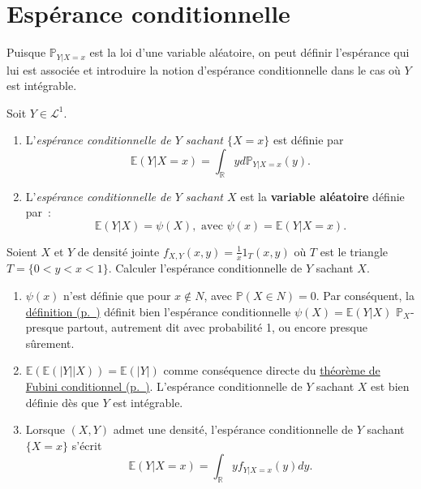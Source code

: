 \chapter{Espérance
conditionnelle}\label{III-espuxe9rance-conditionnelle-1}

Puisque \(\mathbb{P}_{Y|X=x}\) est la loi d'une variable aléatoire, on
peut définir l'espérance qui lui est associée et introduire la notion
d'espérance conditionnelle dans le cas où \(Y\) est intégrable.

\begin{definition}\label{III-defespcond}

Soit \(Y \in \mathcal{L}^1\).

\begin{enumerate}
\def\labelenumi{\arabic{enumi}.}
\tightlist
\item
  L'\emph{espérance conditionnelle de \(Y\) sachant \(\{X=x\}\)} est
  définie par
  \[\mathbb{E}(Y|X=x) = \int_\mathbb{R}y d\mathbb{P}_{Y|X=x} (y).\]
\item
  L'\emph{espérance conditionnelle de \(Y\) sachant \(X\)} est la
  \textbf{variable aléatoire} définie par~:
  \[\mathbb{E}(Y|X) = \psi(X), \text{ avec } \psi(x) = \mathbb{E}(Y|X=x).\]
\end{enumerate}
\end{definition}

\label{III-etb2}
Soient \(X\) et \(Y\) de densité jointe
\(f_{X,Y}(x,y)= \frac{1}{x}1_T (x,y)\) où \(T\) est le triangle
\(T = \{0< y< x < 1\}\). Calculer l'espérance conditionnelle de \(Y\)
sachant \(X\).

\begin{remarque}[{Conséquences}]\label{III-consuxe9quences-1}

\begin{enumerate}
\def\labelenumi{\arabic{enumi}.}
\tightlist
\item
  \(\psi(x)\) n'est définie que pour \(x \notin N\), avec
  \(\mathbb{P}(X\in N) = 0\). Par conséquent, la
  \protect\hyperref[III-defespcond]{définition (p.~\pageref*{III-defespcond})}
  définit bien l'espérance conditionnelle \(\psi(X) = \mathbb{E}(Y|X)\)
  \(\mathbb{P}_X\)-presque partout, autrement dit avec probabilité 1, ou
  encore presque sûrement.
\item
  \(\mathbb{E}(\mathbb{E}(|Y||X)) = \mathbb{E}(|Y|)\) comme conséquence
  directe du \protect\hyperref[III-fubinicond]{théorème de Fubini
  conditionnel (p.~\pageref*{III-fubinicond})}. L'espérance
  conditionnelle de \(Y\) sachant \(X\) est bien définie dès que \(Y\)
  est intégrable.
\item
  Lorsque \((X,Y)\) admet une densité, l'espérance conditionnelle de
  \(Y\) sachant \(\{X=x\}\) s'écrit
  \[\mathbb{E}(Y|X=x) = \int_\mathbb{R}y f_{Y|X=x}(y) dy.\]
\end{enumerate}
\end{remarque}

